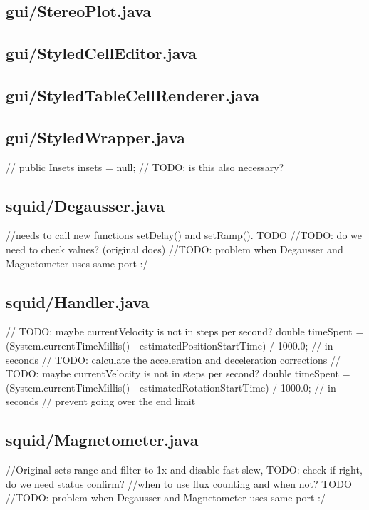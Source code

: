 \subsection{gui/StereoPlot.java}

\subsection{gui/StyledCellEditor.java}

\subsection{gui/StyledTableCellRenderer.java}

\subsection{gui/StyledWrapper.java}
//        public Insets insets = null; // TODO: is this also necessary?

\subsection{squid/Degausser.java}
        //needs to call new functions setDelay() and setRamp(). TODO
        //TODO: do we need to check values? (original does)
        //TODO: problem when Degausser and Magnetometer uses same port :/

\subsection{squid/Handler.java}
        // TODO: maybe currentVelocity is not in steps per second?
        double timeSpent = (System.currentTimeMillis() - estimatedPositionStartTime) / 1000.0;    // in seconds
        // TODO: calculate the acceleration and deceleration corrections
        // TODO: maybe currentVelocity is not in steps per second?
        double timeSpent = (System.currentTimeMillis() - estimatedRotationStartTime) / 1000.0;    // in seconds
        // prevent going over the end limit

\subsection{squid/Magnetometer.java}
            //Original sets range and filter to 1x and disable fast-slew, TODO: check if right, do we need status confirm?
        //when to use flux counting and when not? TODO
        //TODO: problem when Degausser and Magnetometer uses same port :/

